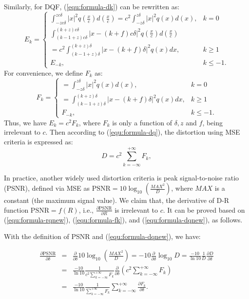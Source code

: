 \documentclass[smallabstract,smallcaptions]{dccpaper}
\begin{document}
Similarly, for DQF, (\ref{equ:formula-dk}) can be rewritten as:  
\begin{equation}\label{equ:formula-dknew}
	E_k =
	\begin{cases}
		\int_{-z c\delta}^{z c\delta} |x|^2 q\left(\frac{x}{c}\right) d\left(\frac{x}{c}\right)
		= c^2\int_{-z \delta}^{z \delta} |x|^2 q(x) d(x),
		& k=0 \\
		\int_{(k-1+z) c\delta}^{(k+z) c\delta} |x - (k+f) c\delta|^2 q\left(\frac{x}{c}\right) d\left(\frac{x}{c}\right)\\
		=c^2\int_{(k-1+z) \delta}^{(k+z) \delta} |x - (k+f) \delta|^2 q(x) dx,
		& k \ge 1 \\
		E_{-k},
		& k \le -1 .
	\end{cases}
\end{equation} 
For convenience, we define $F_k$ as:
\begin{equation}\label{equ:formula-fk}
	F_k =
	\begin{cases}
		= \int_{-z \delta}^{z \delta} |x|^2 q(x) d(x),
		& k=0 \\
		=\int_{(k-1+z) \delta}^{(k+z) \delta} |x - (k+f) \delta|^2 q(x) dx,
		& k \ge 1 \\
		F_{-k},
		& k \le -1 .
	\end{cases}
\end{equation}
Thus, we have $E_k = c^2 F_k$, where $F_k$ is only a function of $\delta, z$ and $f$, being irrelevant to $c$. Then according to (\ref{equ:formula-dq}), the distortion using MSE criteria is expressed as:
\begin{equation}\label{equ:formula-dqnew}
	D = c^2 \sum_{k=-\infty}^{+\infty} F_k, 
\end{equation}

In practice, another widely used distortion criteria is peak signal-to-noise ratio (PSNR), defined via MSE as $\textrm{PSNR} = 10 \log_{10}\left(\frac{MAX^2}{D}\right)$, where $MAX$ is a constant (the maximum signal value). We claim that, the derivative of D-R function $\textrm{PSNR}=f(R)$, i.e., $\frac{\partial\textrm{PSNR}}{\partial R}$ is irrelevant to $c$. It can be proved based on (\ref{equ:formula-rqnew}), (\ref{equ:formula-fk}), and (\ref{equ:formula-dqnew}), as follows.

With the definition of PSNR and (\ref{equ:formula-dqnew}), we have:

\begin{eqnarray*}
\frac{\partial\text{PSNR}}{\partial\delta}
&=&\frac{\partial}{\partial\delta}10 \log_{10}\left(\frac{MAX^2}{D}\right)
=-10\frac{\partial}{\partial\delta}\log_{10}D
=\frac{-10}{\ln{10}}\frac{1}{D}\frac{\partial D}{\partial\delta}
\\&=&\frac{-10}{\ln{10}}\frac{1}{c^2 \sum_{k=-\infty}^{+\infty} F_k}\frac{\partial}{\partial\delta} \left(c^2 \sum_{k=-\infty}^{+\infty} F_k\right)
\\&=&\frac{-10}{\ln{10}}\frac{1}{\sum_{k=-\infty}^{+\infty} F_k}\sum_{k=-\infty}^{+\infty} \frac{\partial F_k}{\partial\delta} .
\end{eqnarray*}
\end{document}
